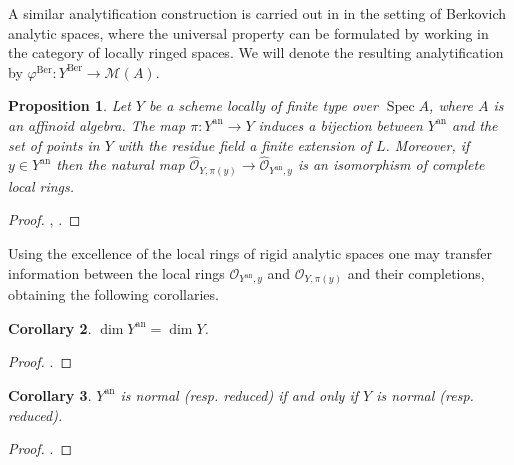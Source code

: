 \documentclass{amsart}
\newtheorem{prop}{Proposition}[section]
\newtheorem{cor}[prop]{Corollary}
\theoremstyle{definition}
\theoremstyle{remark}
\DeclareMathOperator{\Spec}{Spec}
\newcommand{\MM}{\mathscr M}
\newcommand{\OO}{\mathcal O}
\newcommand{\ana}{\mathrm{an}}
\newcommand{\Ber}{\mathrm{Ber}}
\begin{document}
A similar analytification 
construction is carried out in \cite[Section 2.6]{berkovich_ihes}
in the setting of Berkovich analytic spaces, where
the universal property can be formulated by working in 
the category of locally ringed spaces. 
We will denote the resulting analytification 
by $\varphi^{\Ber}: Y^{\Ber}\rightarrow \MM(A)$. 



\begin{prop}\label{points} Let $Y$ be a scheme locally of finite type over $\Spec A$, where $A$ is an affinoid algebra. The map $\pi: Y^{\ana}\rightarrow Y$ induces a bijection 
between $Y^{\ana}$ and the set of points in $Y$ with the residue field 
a finite extension of $L$. Moreover, if $y\in Y^{\ana}$ then the 
natural map $\widehat{\OO}_{Y, \pi(y)} \rightarrow \widehat{\OO}_{Y^{\ana}, y}$ is an isomorphism of complete local rings.
\end{prop}
\begin{proof} \cite[Satz 2.1]{Koepf}, \cite[Example 2.2.11]{conrad_ample}. 
\end{proof} 
Using the excellence of the local rings of rigid analytic spaces one
may transfer information between the local rings $\OO_{Y^{\ana}, y}$
and $\OO_{Y, \pi(y)}$ and their completions, obtaining the following
corollaries. 
 \begin{cor} $\dim Y^{\ana}=\dim Y$.
\end{cor}
\begin{proof} \cite[Folgerung 2.5]{Koepf}.
\end{proof}

\begin{cor} $Y^{\ana}$ is normal (resp. reduced) if and only if $Y$ is 
normal (resp. reduced).
\end{cor}
\begin{proof} \cite[Folgerung 2.5, 2.6]{Koepf}. 
\end{proof} 
\end{document}
